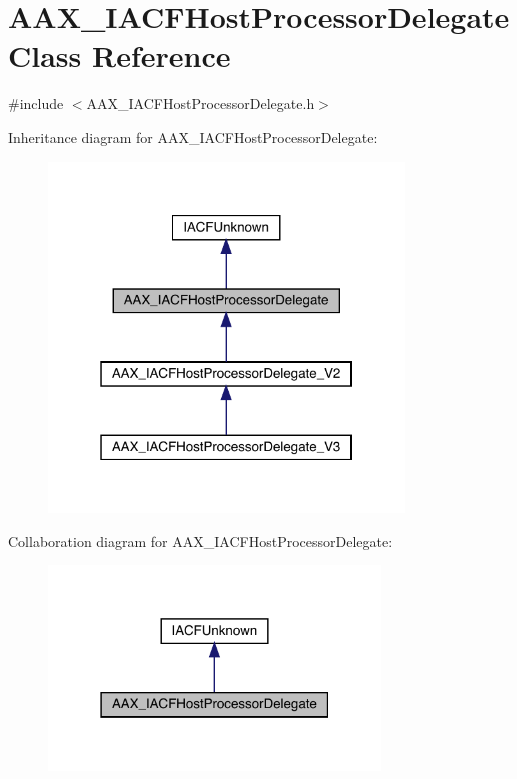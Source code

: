 \hypertarget{a01701}{}\section{A\+A\+X\+\_\+\+I\+A\+C\+F\+Host\+Processor\+Delegate Class Reference}
\label{a01701}


{\ttfamily \#include $<$A\+A\+X\+\_\+\+I\+A\+C\+F\+Host\+Processor\+Delegate.\+h$>$}



Inheritance diagram for A\+A\+X\+\_\+\+I\+A\+C\+F\+Host\+Processor\+Delegate\+:
\nopagebreak
\begin{figure}[H]
\begin{center}
\leavevmode
\includegraphics[width=268pt]{a01700}
\end{center}
\end{figure}


Collaboration diagram for A\+A\+X\+\_\+\+I\+A\+C\+F\+Host\+Processor\+Delegate\+:
\nopagebreak
\begin{figure}[H]
\begin{center}
\leavevmode
\includegraphics[width=250pt]{a01699}
\end{center}
\end{figure}


